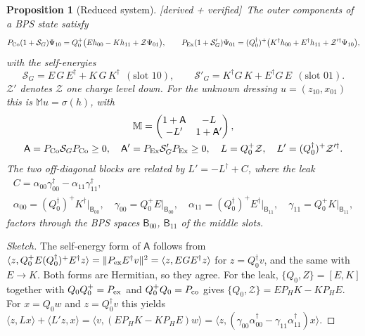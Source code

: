 \documentclass[11pt]{article}
\newcommand{\ip}[2]{\langle #1,#2\rangle}
\newcommand{\B}{\mathsf B}
\newcommand{\PH}{P_{\!H}}
\newcommand{\Zc}{\mathcal Z}
\newcommand{\Mb}{\mathbb M}
\newcommand{\SG}{\mathcal S_G}
\newcommand{\SGp}{\mathcal S'_G}
\newcommand{\tagbox}[2]{\textsf{\small\color{#1}[#2]}}
\newcommand{\VER}{\tagbox{cder}{derived + verified}}
\theoremstyle{plain}
\newtheorem{proposition}{Proposition}
\theoremstyle{remark}
\numberwithin{equation}{section}
\begin{document}
\begin{proposition}[Reduced system]\label{prop:reduced}\VER\
The outer components of a BPS state satisfy
\begin{equation}\label{eq:dyson}
P_{\rm Co}(1+\SG)\Psi_{10}=Q_0^+\big(Eh_{00}-Kh_{11}+\Zc\Psi_{01}\big),\qquad
P_{\rm Ex}(1+\SGp)\Psi_{01}=(Q_0^\dagger)^+\big(K^\dagger h_{00}+E^\dagger h_{11}+\Zc'^\dagger\Psi_{10}\big),
\end{equation}
with the self-energies
\begin{equation}\label{eq:selfenergy}
\SG=E\,G\,E^\dagger+K\,G\,K^\dagger\ \ (\text{slot }10),\qquad \SGp=K^\dagger G\,K+E^\dagger G\,E\ \ (\text{slot }01).
\end{equation}
$\Zc'$ denotes $\Zc$ one charge level down. For the unknown dressing $u=(z_{10},x_{01})$ this is
$\Mb u=\sigma(h)$, with
\begin{equation}\label{eq:M}
\begin{gathered}
\Mb=\begin{pmatrix}1+\mathsf A&-L\\-L'&1+\mathsf A'\end{pmatrix},\\
\mathsf A=P_{\rm Co}\SG P_{\rm Co}\ge0,\quad \mathsf A'=P_{\rm Ex}\SGp P_{\rm Ex}\ge0,\quad L=Q_0^+\Zc,\quad
L'=(Q_0^\dagger)^+\Zc'^\dagger .
\end{gathered}
\end{equation}
The two off-diagonal blocks are related by $L'=-L^\dagger+C$, where the \emph{leak}
\begin{equation}\label{eq:leak}
\begin{gathered}
C=\alpha_{00}\gamma_{00}^\dagger-\alpha_{11}\gamma_{11}^\dagger,\\
\alpha_{00}=(Q_0^\dagger)^+K^\dagger\big|_{\B_{00}},\quad \gamma_{00}=Q_0^+E\big|_{\B_{00}},\quad
\alpha_{11}=(Q_0^\dagger)^+E^\dagger\big|_{\B_{11}},\quad \gamma_{11}=Q_0^+K\big|_{\B_{11}},
\end{gathered}
\end{equation}
factors through the BPS spaces $\B_{00}$, $\B_{11}$ of the middle slots.
\end{proposition}
\begin{proof}[Sketch]
The self-energy form of $\mathsf A$ follows from $\ip{z}{Q_0^+E(Q_0^\dagger)^+E^\dagger z}=\|P_{\rm ex}E^\dagger
v\|^2=\ip{z}{EGE^\dagger z}$ for $z=Q_0^\dagger v$, and the same with $E\to K$. Both forms are Hermitian, so they agree.
For the leak, $\{Q_0,Z\}=[E,K]$ together with $Q_0Q_0^+=P_{\rm ex}$ and $Q_0^+Q_0=P_{\rm co}$ gives
$\{Q_0,\Zc\}=E\PH K-K\PH E$. For $x=Q_0w$ and $z=Q_0^\dagger v$ this yields
$\ip{z}{Lx}+\ip{L'z}{x}=\ip{v}{(E\PH K-K\PH E)w}=\ip{z}{(\gamma_{00}\alpha_{00}^\dagger-\gamma_{11}\alpha_{11}^\dagger)x}$.
\end{proof}
\end{document}
